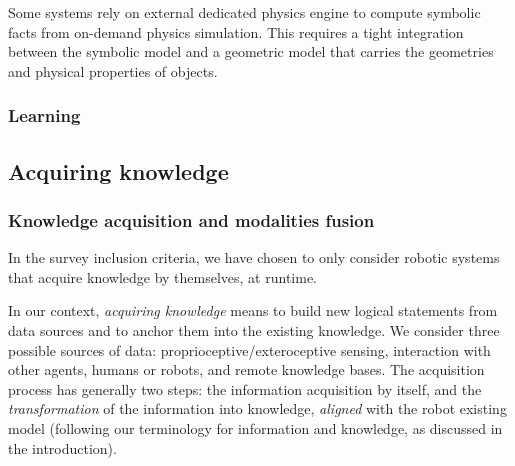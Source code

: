 \documentclass[a4paper, twocolumn]{article}
\begin{document}
Some systems \cite{Kunze2011a} rely on external dedicated physics engine to
compute symbolic facts from on-demand physics simulation. This requires a tight
integration between the symbolic model and a geometric model that carries the
geometries and physical properties of objects.

\subsubsection{Learning}
\label{sect|learning}


\subsection{Acquiring knowledge}

\begin{scriptsize}
\begin{center}
\end{center}
\end{scriptsize}

\subsubsection{Knowledge acquisition and modalities fusion}
\label{sect|knowledge-acquisition}

In the survey inclusion criteria, we have chosen to only consider robotic
systems that acquire knowledge by themselves, at runtime.

In our context, \emph{acquiring knowledge} means to build new logical
statements from data sources and to anchor them into the existing knowledge. We
consider three possible sources of data: proprioceptive/exteroceptive sensing,
interaction with other agents, humans or robots, and remote knowledge bases.
The acquisition process has generally two steps: the information acquisition by
itself, and the \emph{transformation} of the information into knowledge,
\emph{aligned} with the robot existing model (following our terminology for
information and knowledge, as discussed in the introduction).
\end{document}
